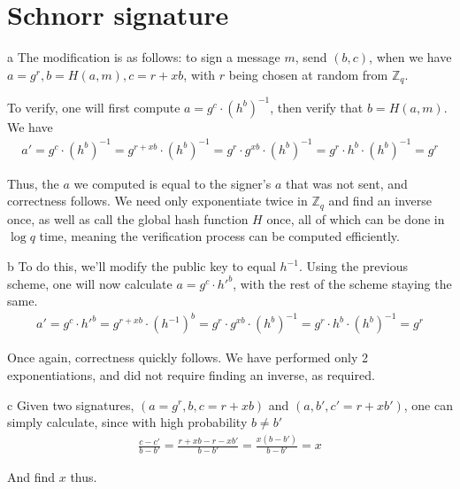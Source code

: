 \documentclass{article}
\begin{document}
\section{Schnorr signature}
\begin{paragraph}
    a The modification is as follows: to sign a message \(m\), send \((b, c)\), when we have \(a = g^r, b = H(a, m), c = r + xb\), with \(r\) being chosen at random from \(\mathbb{Z}_q\).
    
    To verify, one will first compute \(a = g^c \cdot (h^b)^{-1}\), then verify that \(b = H(a, m)\).\\
    
    We have
    \begin{align*}
        a' = g^c \cdot(h^b)^{-1} = g^{r + xb} \cdot(h^b)^{-1} = g^r \cdot g^{xb} \cdot(h^b)^{-1} = g^r \cdot h^b \cdot(h^b)^{-1} = g^r
    \end{align*}
    
    Thus, the \(a\) we computed is equal to the signer's \(a\) that was not sent, and correctness follows. We need only exponentiate twice in \(\mathbb{Z}_q\) and find an inverse once, as well as call the global hash function \(H\) once, all of which can be done in \(\log q\) time, meaning the verification process can be computed efficiently.
\end{paragraph}

\begin{paragraph}
    b To do this, we'll modify the public key to equal \(h^{-1}\). Using the previous scheme, one will now calculate \(a = g^c \cdot h'^b\), with the rest of the scheme staying the same.
    \begin{align*}
        a' = g^c \cdot h'^b = g^{r + xb} \cdot(h^{-1})^b = g^r \cdot g^{xb} \cdot(h^b)^{-1} = g^r \cdot h^b \cdot(h^b)^{-1} = g^r
    \end{align*}
    
    Once again, correctness quickly follows. We have performed only 2 exponentiations, and did not require finding an inverse, as required.
\end{paragraph}

\begin{paragraph}
    c Given two signatures, \((a = g^r, b, c = r + xb)\) and \((a, b', c' = r + xb')\), one can simply calculate, since with high probability \(b \neq b'\)
    \begin{align*}
        \frac{c - c'}{b - b'} = \frac{r + xb - r - xb'}{b - b'} = \frac{x(b - b')}{b - b'} = x
    \end{align*}
    
    And find \(x\) thus.
\end{paragraph}
\end{document}
